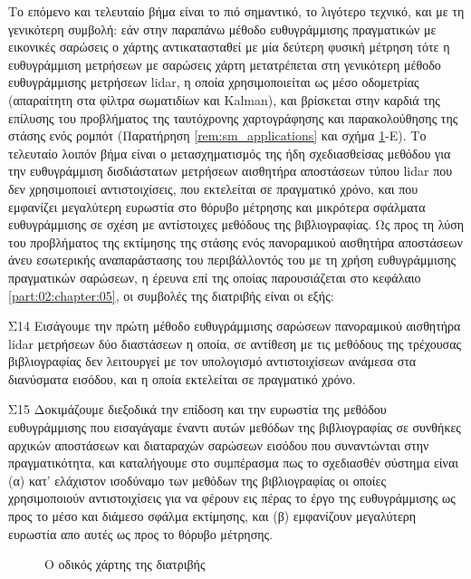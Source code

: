 Το επόμενο και τελευταίο βήμα είναι το πιό σημαντικό, το λιγότερο τεχνικό, και
με τη γενικότερη συμβολή: εάν στην παραπάνω μέθοδο ευθυγράμμισης πραγματικών με
εικονικές σαρώσεις ο χάρτης αντικατασταθεί με μία δεύτερη φυσική μέτρηση τότε η
ευθυγράμμιση μετρήσεων με σαρώσεις χάρτη μετατρέπεται στη γενικότερη μέθοδο
ευθυγράμμισης μετρήσεων lidar, η οποία χρησιμοποιείται ως μέσο οδομετρίας
(απαραίτητη στα φίλτρα σωματιδίων και Kalman), και βρίσκεται στην καρδιά της
επίλυσης του προβλήματος της ταυτόχρονης χαρτογράφησης και παρακολούθησης της
στάσης ενός ρομπότ (Παρατήρηση \ref{rem:sm_applications} και σχήμα
\ref{fig:roadmap}-Ε). Το τελευταίο λοιπόν βήμα είναι ο μετασχηματισμός της ήδη
σχεδιασθείσας μεθόδου για την ευθυγράμμιση δισδιάστατων μετρήσεων αισθητήρα
αποστάσεων τύπου lidar που δεν χρησιμοποιεί αντιστοιχίσεις, που εκτελείται σε
πραγματικό χρόνο, και που εμφανίζει μεγαλύτερη ευρωστία στο θόρυβο μέτρησης και
μικρότερα σφάλματα ευθυγράμμισης σε σχέση με αντίστοιχες μεθόδους της
βιβλιογραφίας. Ως προς τη λύση του προβλήματος της εκτίμησης της στάσης ενός
πανοραμικού αισθητήρα αποστάσεων άνευ εσωτερικής αναπαράστασης του
περιβάλλοντός του με τη χρήση ευθυγράμμισης πραγματικών σαρώσεων, η έρευνα επί
της οποίας παρουσιάζεται στο κεφάλαιο \ref{part:02:chapter:05}, οι συμβολές της
διατριβής είναι οι εξής:

\begin{bw_box}
\begin{customcontribution}{Σ14}
  \label{contribution:14}
  Εισάγουμε την πρώτη μέθοδο ευθυγράμμισης σαρώσεων πανοραμικού αισθητήρα
  lidar μετρήσεων δύο διαστάσεων η οποία, σε αντίθεση με τις μεθόδους της
  τρέχουσας βιβλιογραφίας δεν λειτουργεί με τον υπολογισμό αντιστοιχίσεων
  ανάμεσα στα διανύσματα εισόδου, και η οποία εκτελείται σε πραγματικό χρόνο.
\end{customcontribution}
\end{bw_box}

\begin{bw_box}
\begin{customcontribution}{Σ15}
  \label{contribution:15}
  Δοκιμάζουμε διεξοδικά την επίδοση και την ευρωστία της μεθόδου ευθυγράμμισης
  που εισαγάγαμε έναντι αυτών μεθόδων της βιβλιογραφίας σε
  συνθήκες αρχικών αποστάσεων και διαταραχών σαρώσεων εισόδου που συναντώνται
  στην πραγματικότητα, και καταλήγουμε στο συμπέρασμα πως το σχεδιασθέν
  σύστημα είναι (α) κατ' ελάχιστον ισοδύναμο των μεθόδων της βιβλιογραφίας οι
  οποίες χρησιμοποιούν αντιστοιχίσεις για να φέρουν εις πέρας το έργο της
  ευθυγράμμισης ως προς το μέσο και διάμεσο σφάλμα εκτίμησης, και (β)
  εμφανίζουν μεγαλύτερη ευρωστία απο αυτές ως προς το θόρυβο μέτρησης.
\end{customcontribution}
\end{bw_box}

\begin{figure}\hspace{-2cm}
  
  \caption{\small Ο οδικός χάρτης της διατριβής}
  \label{fig:roadmap}
\end{figure}
